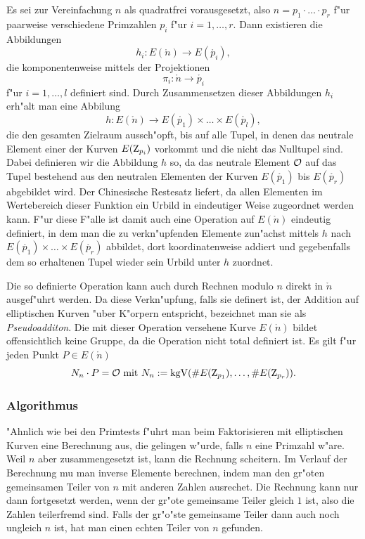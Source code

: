 Es sei zur Vereinfachung $n$ als quadratfrei vorausgesetzt, also $n=p_1
\cdot\ldots\cdot p_r$ f"ur paarweise verschiedene Primzahlen $p_i$
f"ur $i=1,\ldots,r$.  Dann existieren die Abbildungen
$$ h_i : E(\ring{n}) \longrightarrow E(\ring{p_i}), $$
die komponentenweise mittels der Projektionen
$$ \pi_i : \ring{n} \longrightarrow \ring{p_i} $$ 
f"ur $i = 1,\ldots,l$ definiert sind. Durch Zusammensetzen dieser
Abbildungen $h_i$ erh"alt man eine Abbilung
$$ h : E(\ring{n}) \longrightarrow E(\ring{p_1}) \times 
   \ldots \times E(\ring{p_l}), $$
die den gesamten Zielraum aussch"opft, bis auf alle Tupel, in denen das
neutrale Element einer der Kurven $E(\Z_{p_i})$ vorkommt und die nicht
das Nulltupel sind. Dabei
definieren wir die Abbildung $h$ so, da\3 das neutrale Element ${\cal
O}$ auf das Tupel bestehend aus den neutralen Elementen der Kurven
$E(\ring{p_1})$ bis $E(\ring{p_r})$ abgebildet wird. Der Chinesische
Restesatz liefert, da\3 allen Elementen im Wertebereich dieser
Funktion ein Urbild in eindeutiger Weise zugeordnet werden kann. F"ur
diese F"alle ist damit auch eine Operation auf $E(\ring{n})$ eindeutig
definiert, in dem man die zu verkn"upfenden Elemente zun"achst mittels
$h$ nach $E(\ring{p_1}) \times \ldots \times E(\ring{p_r})$ abbildet,
dort koordinatenweise addiert und gegebenfalls dem so erhaltenen Tupel
wieder sein Urbild unter $h$ zuordnet.

Die so definierte Operation kann auch durch Rechnen modulo $n$ direkt
in $\ring{n}$ ausgef"uhrt werden. Da diese Verkn"upfung, falls sie
definert ist, der Addition auf elliptischen Kurven "uber K"orpern
entspricht, bezeichnet man sie als {\em Pseudoadditon}. Die mit dieser
Operation versehene Kurve $E(\ring{n})$ bildet offensichtlich keine
Gruppe, da die Operation nicht total definiert ist. Es gilt f"ur jeden
Punkt $P\in E(\ring{n})$
$$ N_n \cdot P = {\cal O} \mbox{ mit } N_n := \kgv(\# E(\ring{p_1}),\ldots,\# E(\ring{p_r})). $$


\subsubsection{Algorithmus}

"Ahnlich wie bei den Primtests f"uhrt man beim Faktorisieren mit
elliptischen Kurven eine Berechnung aus, die gelingen w"urde, falls
$n$ eine Primzahl w"are.  Weil $n$ aber zusammengesetzt ist, kann die
Rechnung scheitern. Im Verlauf der Berechnung mu\3 man inverse Elemente
berechnen, indem man den gr"o\3ten gemeinsamen Teiler von $n$ mit
anderen Zahlen ausrechet. Die Rechnung kann nur dann fortgesetzt
werden, wenn der gr"o\3te gemeinsame Teiler gleich $1$ ist, also die
Zahlen teilerfremd sind. Falls der gr"o"ste gemeinsame Teiler dann auch
noch ungleich $n$ ist, hat man einen echten Teiler von $n$ gefunden.

